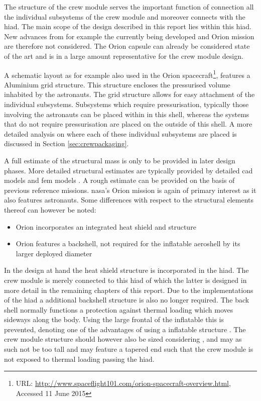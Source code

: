 The structure of the crew module serves the important function of connection all the individual subsystems of the crew module and moreover connects with the \gls{hiad}. The main scope of the design described in this report lies within this \gls{hiad}. New advances from for example the currently being developed and Orion mission are therefore not considered. The Orion capsule can already be considered state of the art and is in a large amount representative for the crew module design.

A schematic layout as for example also used in the Orion spacecraft\footnote{URL: \url{http://www.spaceflight101.com/orion-spacecraft-overview.html}, Accessed 11 June 2015 }, features a Aluminium grid structure. This structure encloses the pressurised volume inhabited by the astronauts. The grid structure allows for easy attachment of the individual subsystems. Subsystems which require pressurisation, typically those involving the astronauts can be placed within in this shell, whereas the systems that do not require pressurisation are placed on the outside of this shell. A more detailed analysis on where each of these individual subsystems are placed is discussed in Section \ref{sec:crewpackaging}.


A full estimate of the structural mass is only to be provided in later design phases. More detailed structural estimates are typically provided by detailed \gls{cad} models and \gls{fem} models \cite{Wertz2011}. A rough estimate can be provided on the basis of previous reference missions. \gls{nasa}'s Orion mission is again of primary interest as it also features astronauts. Some differences with respect to the structural elements thereof can however be noted:

\begin{itemize}
\item Orion incorporates an integrated heat shield and structure
\item Orion features a backshell, not required for the inflatable aeroshell by its larger deployed diameter
\end{itemize}

In the design at hand the heat shield structure is incorporated in the \gls{hiad}. The crew module is merely connected to this \gls{hiad} of which the latter is designed in more detail in the remaining chapters of this report. Due to the implementations of the \gls{hiad} a additional backshell structure is also no longer required. The back shell normally functions a protection against thermal loading which moves sideways along the body. Using the large frontal of the inflatable this is prevented, denoting one of the advantages of using a inflatable structure \cite{Hughes2005}. The crew module structure should however also be sized considering , and may as such not be too tall and may feature a tapered end such that the crew module is not exposed to thermal loading passing the \gls{hiad}.

